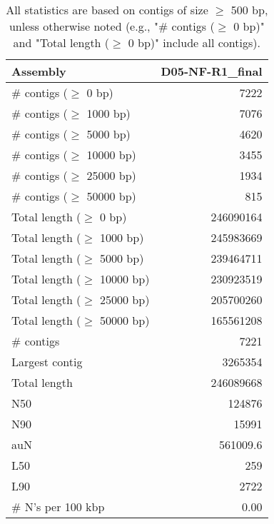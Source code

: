 \documentclass[12pt,a4paper]{article}
\begin{document}
\begin{table}[ht]
\begin{center}
\caption{All statistics are based on contigs of size $\geq$ 500 bp, unless otherwise noted (e.g., "\# contigs ($\geq$ 0 bp)" and "Total length ($\geq$ 0 bp)" include all contigs).}
\begin{tabular}{|l*{1}{|r}|}
\hline
Assembly & D05-NF-R1\_final \\ \hline
\# contigs ($\geq$ 0 bp) & 7222 \\ \hline
\# contigs ($\geq$ 1000 bp) & 7076 \\ \hline
\# contigs ($\geq$ 5000 bp) & 4620 \\ \hline
\# contigs ($\geq$ 10000 bp) & 3455 \\ \hline
\# contigs ($\geq$ 25000 bp) & 1934 \\ \hline
\# contigs ($\geq$ 50000 bp) & 815 \\ \hline
Total length ($\geq$ 0 bp) & 246090164 \\ \hline
Total length ($\geq$ 1000 bp) & 245983669 \\ \hline
Total length ($\geq$ 5000 bp) & 239464711 \\ \hline
Total length ($\geq$ 10000 bp) & 230923519 \\ \hline
Total length ($\geq$ 25000 bp) & 205700260 \\ \hline
Total length ($\geq$ 50000 bp) & 165561208 \\ \hline
\# contigs & 7221 \\ \hline
Largest contig & 3265354 \\ \hline
Total length & 246089668 \\ \hline
N50 & 124876 \\ \hline
N90 & 15991 \\ \hline
auN & 561009.6 \\ \hline
L50 & 259 \\ \hline
L90 & 2722 \\ \hline
\# N's per 100 kbp & 0.00 \\ \hline
\end{tabular}
\end{center}
\end{table}
\end{document}

